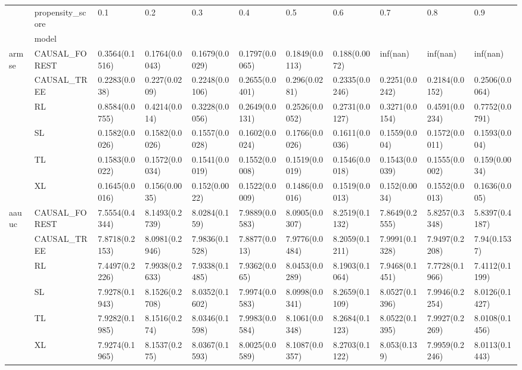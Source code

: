 \begin{tabular}{lllllllllll}
\toprule
      & propensity\_score &             0.1 &             0.2 &             0.3 &             0.4 &             0.5 &             0.6 &             0.7 &             0.8 &             0.9 \\
{} & model &                 &                 &                 &                 &                 &                 &                 &                 &                 \\
\midrule
armse & CAUSAL\_FOREST &  0.3564(0.1516) &  0.1764(0.0043) &  0.1679(0.0029) &  0.1797(0.0065) &  0.1849(0.0113) &   0.188(0.0072) &        inf(nan) &        inf(nan) &        inf(nan) \\
      & CAUSAL\_TREE &   0.2283(0.038) &   0.227(0.0209) &  0.2248(0.0106) &  0.2655(0.0401) &   0.296(0.0281) &  0.2335(0.0246) &  0.2251(0.0242) &  0.2184(0.0152) &  0.2506(0.0064) \\
      & RL &  0.8584(0.0755) &   0.4214(0.014) &  0.3228(0.0056) &  0.2649(0.0131) &  0.2526(0.0052) &  0.2731(0.0127) &  0.3271(0.0154) &  0.4591(0.0234) &  0.7752(0.0791) \\
      & SL &  0.1582(0.0026) &  0.1582(0.0026) &  0.1557(0.0028) &  0.1602(0.0024) &  0.1766(0.0026) &  0.1611(0.0036) &   0.1559(0.004) &  0.1572(0.0011) &   0.1593(0.004) \\
      & TL &  0.1583(0.0022) &  0.1572(0.0034) &  0.1541(0.0019) &  0.1552(0.0008) &  0.1519(0.0019) &  0.1546(0.0018) &  0.1543(0.0039) &  0.1555(0.0002) &   0.159(0.0034) \\
      & XL &  0.1645(0.0016) &   0.156(0.0035) &   0.152(0.0022) &  0.1522(0.0009) &  0.1486(0.0016) &  0.1519(0.0013) &   0.152(0.0034) &  0.1552(0.0013) &   0.1636(0.005) \\
aauuc & CAUSAL\_FOREST &  7.5554(0.4344) &  8.1493(0.2739) &   8.0284(0.159) &  7.9889(0.0583) &  8.0905(0.0307) &  8.2519(0.1132) &  7.8649(0.2555) &  5.8257(0.3348) &  5.8397(0.4187) \\
      & CAUSAL\_TREE &  7.8718(0.2153) &  8.0981(0.2946) &  7.9836(0.1528) &   7.8877(0.013) &  7.9776(0.0484) &  8.2059(0.1211) &  7.9991(0.1328) &  7.9497(0.2208) &    7.94(0.1537) \\
      & RL &  7.4497(0.2226) &  7.9938(0.2633) &  7.9338(0.1485) &   7.9362(0.065) &  8.0453(0.0289) &  8.1903(0.1064) &  7.9468(0.1451) &  7.7728(0.1966) &  7.4112(0.1199) \\
      & SL &  7.9278(0.1943) &  8.1526(0.2708) &  8.0352(0.1602) &  7.9974(0.0583) &  8.0998(0.0341) &  8.2659(0.1109) &  8.0527(0.1396) &  7.9946(0.2254) &  8.0126(0.1427) \\
      & TL &  7.9282(0.1985) &   8.1516(0.274) &  8.0346(0.1598) &  7.9983(0.0584) &  8.1061(0.0348) &  8.2684(0.1123) &  8.0522(0.1395) &  7.9927(0.2269) &  8.0108(0.1456) \\
      & XL &  7.9274(0.1965) &   8.1537(0.275) &  8.0367(0.1593) &  8.0025(0.0589) &  8.1087(0.0357) &  8.2703(0.1122) &    8.053(0.139) &  7.9959(0.2246) &  8.0113(0.1443) \\
\bottomrule
\end{tabular}
